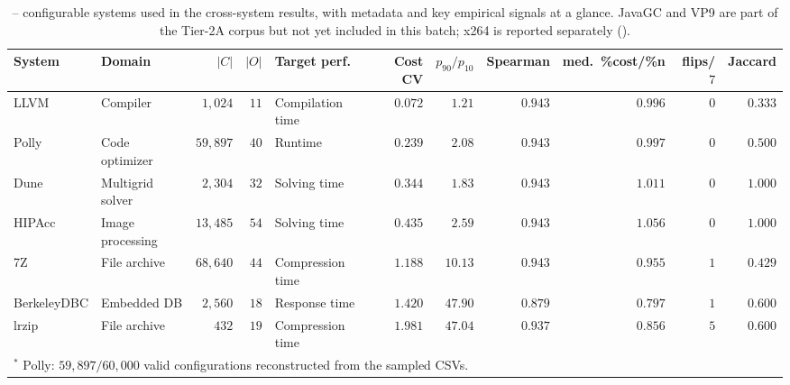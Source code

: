 \begin{table}[t]
\centering
\caption{\StudyReplication -- configurable systems used in the
cross-system results, with metadata and key empirical signals at a
glance. JavaGC and VP9 are part of the Tier-2A corpus but not yet
included in this batch; x264 is reported separately
().}
\label{tab:systems-and-cost}
\footnotesize
\setlength{\tabcolsep}{4.5pt}
\begin{tabular}{l l r r l r r r r r r}
\toprule
System  & Domain & $|C|$ & $|O|$ & Target perf. & Cost CV & $p_{90}/p_{10}$ & Spearman & med.\ \%cost/\%n & flips/$7$ & Jaccard \\
\midrule
LLVM        & Compiler            & $1{,}024$    & $11$ & Compilation time & $0.072$ & $1.21$  & $0.943$ & $0.996$ & $0$ & $0.333$ \\
Polly       & Code optimizer      & $59{,}897$\rlap{$^{*}$} & $40$ & Runtime          & $0.239$ & $2.08$  & $0.943$ & $0.997$ & $0$ & $0.500$ \\
Dune        & Multigrid solver    & $2{,}304$    & $32$ & Solving time     & $0.344$ & $1.83$  & $0.943$ & $1.011$ & $0$ & $1.000$ \\
HIPAcc      & Image processing    & $13{,}485$   & $54$ & Solving time     & $0.435$ & $2.59$  & $0.943$ & $1.056$ & $0$ & $1.000$ \\
7Z          & File archive        & $68{,}640$   & $44$ & Compression time & $1.188$ & $10.13$ & $0.943$ & $0.955$ & $1$ & $0.429$ \\
BerkeleyDBC & Embedded DB         & $2{,}560$    & $18$ & Response time    & $1.420$ & $47.90$ & $0.879$ & $0.797$ & $1$ & $0.600$ \\
lrzip       & File archive        & $432$        & $19$ & Compression time & $1.981$ & $47.04$ & $0.937$ & $0.856$ & $5$ & $0.600$ \\
\bottomrule
\multicolumn{11}{l}{\footnotesize $^{*}$ Polly: $59{,}897/60{,}000$ valid configurations reconstructed from the sampled CSVs.}
\end{tabular}
\end{table}

